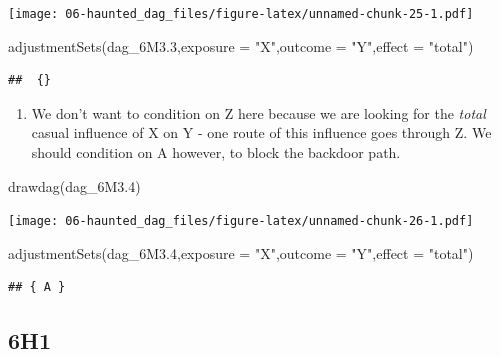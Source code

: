 \documentclass[
]{book}
\newenvironment{Shaded}{\begin{snugshade}}{\end{snugshade}}
\newcommand{\AttributeTok}[1]{\textcolor[rgb]{0.77,0.63,0.00}{#1}}
\newcommand{\FloatTok}[1]{\textcolor[rgb]{0.00,0.00,0.81}{#1}}
\newcommand{\FunctionTok}[1]{\textcolor[rgb]{0.00,0.00,0.00}{#1}}
\newcommand{\NormalTok}[1]{#1}
\newcommand{\StringTok}[1]{\textcolor[rgb]{0.31,0.60,0.02}{#1}}
\providecommand{\tightlist}{%
  \setlength{\itemsep}{0pt}\setlength{\parskip}{0pt}}
\begin{document}
\texttt{[image: 06-haunted\_dag\_files/figure-latex/unnamed-chunk-25-1.pdf]}

\begin{Shaded}
\begin{Highlighting}[]
\FunctionTok{adjustmentSets}\NormalTok{(dag\_6M3}\FloatTok{.3}\NormalTok{,}\AttributeTok{exposure =} \StringTok{"X"}\NormalTok{,}\AttributeTok{outcome =} \StringTok{"Y"}\NormalTok{,}\AttributeTok{effect =} \StringTok{"total"}\NormalTok{)}
\end{Highlighting}
\end{Shaded}

\begin{verbatim}
##  {}
\end{verbatim}

\begin{enumerate}
\def\labelenumi{\arabic{enumi}.}
\setcounter{enumi}{3}
\tightlist
\item
  We don't want to condition on Z here because we are looking for the \emph{total} casual influence of X on Y - one route of this influence goes through Z. We should condition on A however, to block the backdoor path.
\end{enumerate}

\begin{Shaded}
\begin{Highlighting}[]
\FunctionTok{drawdag}\NormalTok{(dag\_6M3}\FloatTok{.4}\NormalTok{)}
\end{Highlighting}
\end{Shaded}

\texttt{[image: 06-haunted\_dag\_files/figure-latex/unnamed-chunk-26-1.pdf]}

\begin{Shaded}
\begin{Highlighting}[]
\FunctionTok{adjustmentSets}\NormalTok{(dag\_6M3}\FloatTok{.4}\NormalTok{,}\AttributeTok{exposure =} \StringTok{"X"}\NormalTok{,}\AttributeTok{outcome =} \StringTok{"Y"}\NormalTok{,}\AttributeTok{effect =} \StringTok{"total"}\NormalTok{)}
\end{Highlighting}
\end{Shaded}

\begin{verbatim}
## { A }
\end{verbatim}

\hypertarget{h1-2}{%
\subsection*{6H1}\label{h1-2}}
\end{document}
